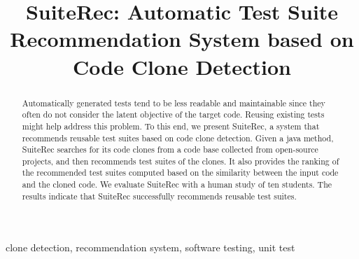 \documentclass[conference]{IEEEtran}
\begin{document}
\title{SuiteRec: Automatic Test Suite Recommendation System based on Code Clone Detection\\
}


\author{
}
\maketitle

\begin{abstract}


Automatically generated tests tend to be less readable and maintainable since they often do not consider the latent objective of the target code. Reusing existing tests might help address this problem. 
To this end, we present SuiteRec, a system that recommends reusable test suites based on code clone detection. Given a java method, SuiteRec searches for its code clones from a code base collected from open-source projects, and then recommends test suites of the clones. It also provides the ranking of the recommended test suites computed based on the similarity between the input code and the cloned code. We evaluate SuiteRec with a human study of ten students. 
The results indicate that SuiteRec successfully recommends reusable test suites.


\end{abstract}

\begin{IEEEkeywords}
 clone detection, recommendation system, software testing, unit test 
\end{IEEEkeywords}
\end{document}
